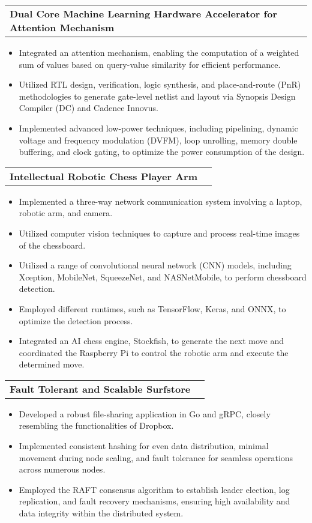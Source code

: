 \documentclass[letterpaper,11pt]{article}
\makeatletter
\newcommand{\resumeItem}[1]{
  \item\small{
    {#1 \vspace{-2pt}}
  }
}
\newcommand{\resumeProjectHeading}[2]{
    \vspace{-2pt}\item
    \begin{tabular*}{0.97\textwidth}{l@{\extracolsep{\fill}}r}
      \small#1 & #2 \\
    \end{tabular*}\vspace{-7pt}
}
\newcommand{\resumeItemListStart}{\begin{itemize}}
\newcommand{\resumeItemListEnd}{\end{itemize}\vspace{-5pt}}
\makeatother
\begin{document}
      \resumeProjectHeading
        {\textbf{Dual Core Machine Learning Hardware Accelerator for Attention Mechanism}}{}
          \resumeItemListStart
            \resumeItem{Integrated an attention mechanism, enabling the computation of a weighted sum of values based on query-value similarity for efficient performance.}
            \resumeItem{Utilized RTL design, verification, logic synthesis, and place-and-route (PnR) methodologies to generate gate-level netlist and layout via Synopsis Design Compiler (DC) and Cadence Innovus.}
            \resumeItem{Implemented advanced low-power techniques, including pipelining, dynamic voltage and frequency modulation (DVFM), loop unrolling, memory double buffering, and clock gating, to optimize the power consumption of the design.}
            \resumeItemListEnd
      
      \resumeProjectHeading
        {\textbf{Intellectual Robotic Chess Player Arm}}{}
          \resumeItemListStart
            \resumeItem{Implemented a three-way network communication system involving a laptop, robotic arm, and camera.}
            \resumeItem{Utilized computer vision techniques to capture and process real-time images of the chessboard.}
            \resumeItem{Utilized a range of convolutional neural network (CNN) models, including Xception, MobileNet, SqueezeNet, and NASNetMobile, to perform chessboard detection.}
            \resumeItem{Employed different runtimes, such as TensorFlow, Keras, and ONNX, to optimize the detection process.}
            \resumeItem{Integrated an AI chess engine, Stockfish, to generate the next move and coordinated the Raspberry Pi to control the robotic arm and execute the determined move.}
            \resumeItemListEnd
      
      \resumeProjectHeading
        {\textbf{Fault Tolerant and Scalable Surfstore}}{}
          \resumeItemListStart
            \resumeItem{Developed a robust file-sharing application in Go and gRPC, closely resembling the functionalities of Dropbox.}
            \resumeItem{Implemented consistent hashing for even data distribution, minimal movement during node scaling, and fault tolerance for seamless operations across numerous nodes.}
            \resumeItem{Employed the RAFT consensus algorithm to establish leader election, log replication, and fault recovery mechanisms, ensuring high availability and data integrity within the distributed system.}
            \resumeItemListEnd
      
\end{document}
